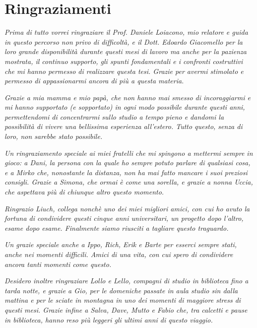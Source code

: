 \chapter*{Ringraziamenti}
\label{cha:acknowledgements}

\textit{Prima di tutto vorrei ringraziare il Prof. Daniele Loiacono, mio relatore e guida in questo percorso non privo di difficoltà, e il Dott. Edoardo Giacomello per la loro grande disponibilità durante questi mesi di lavoro ma anche per la pazienza mostrata, il continuo supporto, gli spunti fondamentali e i confronti costruttivi che mi hanno permesso di realizzare questa tesi. Grazie per avermi stimolato e permesso di appassionarmi ancora di più a questa materia.}

\vspace{5mm}
\noindent\textit{Grazie a mia mamma e mio papà, che non hanno mai smesso di incoraggiarmi e mi hanno supportato (e sopportato) in ogni modo possibile durante questi anni, permettendomi di concentrarmi sullo studio a tempo pieno e dandomi la possibilità di vivere una bellissima esperienza all'estero. Tutto questo, senza di loro, non sarebbe stato possibile.}

\vspace{5mm}
\noindent \textit{Un ringraziamento speciale ai miei fratelli che mi spingono a mettermi sempre in gioco: a Dani, la persona con la quale ho sempre potuto parlare di qualsiasi cosa, e a Mirko che, nonostante la distanza, non ha mai fatto mancare i suoi preziosi consigli. Grazie a Simona, che ormai è come una sorella, e grazie a nonna Uccia, che aspettava più di chiunque altro questo momento.}

\vspace{5mm}
\noindent \textit{Ringrazio Liuch, collega nonchè uno dei miei migliori amici, con cui ho avuto la fortuna di condividere questi cinque anni universitari, un progetto dopo l'altro, esame dopo esame. Finalmente siamo riusciti a tagliare questo traguardo. }


\noindent \textit{Un grazie speciale anche a Ippo, Rich, Erik e Barte per esserci sempre stati, anche nei momenti difficili. Amici di una vita, con cui spero di condividere ancora tanti momenti come questo.}

\vspace{5mm}
\noindent \textit{Desidero inoltre ringraziare Lollo e Lello, compagni di studio in biblioteca fino a tarda notte, e grazie a Gio, per le domeniche passate in aula studio sin dalla mattina e per le sciate in montagna in uno dei momenti di maggiore stress di questi mesi. Grazie infine a Salva, Dave, Mutto e Fabio che, tra calcetti e pause in biblioteca, hanno reso più leggeri gli ultimi anni di questo viaggio.}